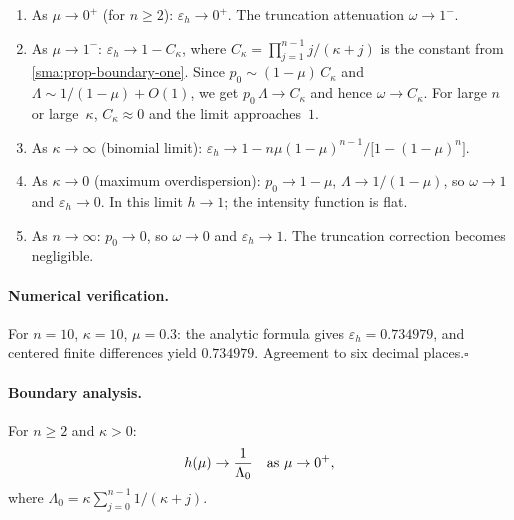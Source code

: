 \begin{proposition}
  \label{sma:prop-elasticity-limits}
  \mbox{}
  \begin{enumerate}[label=\textup{(\alph*)}]
    \item As $\mu \to 0^+$ (for $n \ge 2$):
      $\varepsilon_h \to 0^+$. The truncation attenuation $\omega \to 1^-$.
    \item As $\mu \to 1^-$:
      $\varepsilon_h \to 1 - C_\kappa$, where
      $C_\kappa = \prod_{j=1}^{n-1}j/(\kappa+j)$ is the constant from
      \cref{sma:prop-boundary-one}.  Since
      $p_0 \sim (1-\mu)\,C_\kappa$ and
      $\Lambda \sim 1/(1-\mu) + O(1)$, we get
      $p_0\,\Lambda \to C_\kappa$ and hence
      $\omega \to C_\kappa$.
      For large $n$ or large~$\kappa$, $C_\kappa \approx 0$ and
      the limit approaches~$1$.
    \item As $\kappa \to \infty$ (binomial limit):
      $\varepsilon_h \to 1 - n\mu(1-\mu)^{n-1}\bigl/\bigl[1-(1-\mu)^n\bigr]$.
    \item As $\kappa \to 0$ (maximum overdispersion):
      $p_0 \to 1 - \mu$, $\Lambda \to 1/(1-\mu)$, so $\omega \to 1$ and
      $\varepsilon_h \to 0$. In this limit $h \to 1$; the intensity function
      is flat.
    \item As $n \to \infty$:
      $p_0 \to 0$, so $\omega \to 0$ and $\varepsilon_h \to 1$. The
      truncation correction becomes negligible.
  \end{enumerate}
\end{proposition}

\paragraph{Numerical verification.}
For $n = 10$, $\kappa = 10$, $\mu = 0.3$: the analytic formula gives
$\varepsilon_h = 0.734979$, and centered finite differences yield
$0.734979$. Agreement to six decimal places.\enspace$\square$


\paragraph{Boundary analysis.}

\begin{proposition}[Behavior of $h$ as $\mu \to 0^+$]
  \label{sma:prop-boundary-zero}
  For $n \ge 2$ and $\kappa > 0$:
  \begin{equation}\label{sma:eq-boundary-zero}
    h(\mu) \to \frac{1}{\Lambda_0}
    \quad \textup{as } \mu \to 0^+,
  \end{equation}
  where $\Lambda_0 = \kappa\sum_{j=0}^{n-1}1/(\kappa+j)$.
\end{proposition}

